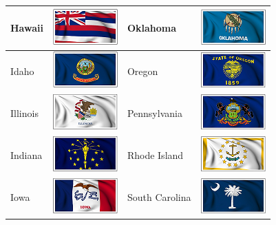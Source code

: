 \documentclass{ximera}
\begin{document}
\begin{center}
\begin{tabular}{|l|l|l|l|}
Hawaii & \includegraphics{pics/StateFlags/Hawaii.png} & Oklahoma & \includegraphics{pics/StateFlags/Oklahoma.png} \\\hline 
Idaho & \includegraphics{pics/StateFlags/Idaho.png} & Oregon & \includegraphics{pics/StateFlags/Oregon.png} \\\hline 
Illinois & \includegraphics{pics/StateFlags/Illinois.png} & Pennsylvania & \includegraphics{pics/StateFlags/Pennsylvania.png} \\\hline 
Indiana & \includegraphics{pics/StateFlags/Indiana.png} & Rhode Island & \includegraphics{pics/StateFlags/RhodeIsland.png} \\\hline 
Iowa & \includegraphics{pics/StateFlags/Iowa.png} & South Carolina & \includegraphics{pics/StateFlags/SouthCarolina.png} \\\hline 

\end{tabular}
\end{center}
\end{document}
